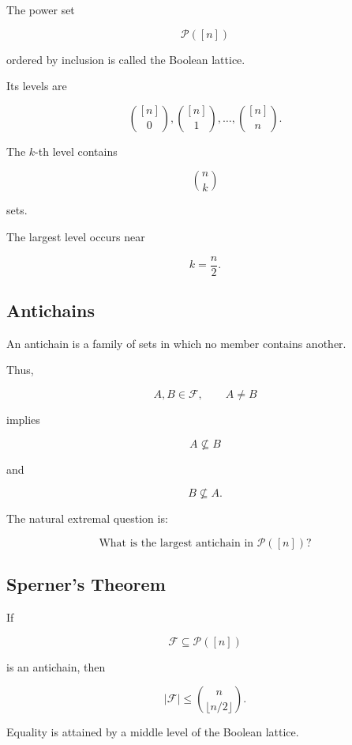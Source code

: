 The power set

\[
\mathcal{P}([n])
\]

ordered by inclusion is called the Boolean lattice.

Its levels are

\[
\boxed{
\binom{[n]}{0},
\binom{[n]}{1},
\ldots,
\binom{[n]}{n}.
}
\]

The \(k\)-th level contains

\[
\binom{n}{k}
\]

sets.

The largest level occurs near

\[
k=\frac n2.
\]

\subsection{Antichains}
\label{subsec:antichains-extremal}

An antichain is a family of sets in which no member contains another.

Thus,

\[
A,B\in\mathcal{F},
\qquad
A\neq B
\]

implies

\[
A\nsubseteq B
\]

and

\[
B\nsubseteq A.
\]

The natural extremal question is:

\[
\boxed{
\text{What is the largest antichain in }\mathcal{P}([n])?
}
\]

\subsection{Sperner's Theorem}
\label{subsec:sperners-theorem}

\begin{theorem}
If

\[
\mathcal{F}
\subseteq
\mathcal{P}([n])
\]

is an antichain, then

\[
\boxed{
|\mathcal{F}|
\leq
\binom{n}{\lfloor n/2\rfloor}.
}
\]

Equality is attained by a middle level of the Boolean lattice.
\end{theorem}

